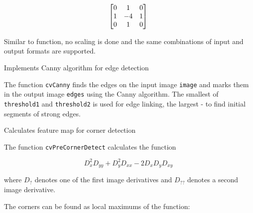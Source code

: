\[ \begin{bmatrix} 0 & 1 & 0\\ 1 & -4 & 1\\ 0 & 1 & 0 \end{bmatrix} \]

Similar to  function, no scaling is done and the same combinations of input and output formats are supported.

\label{Canny}
Implements Canny algorithm for edge detection

\begin{description}
\end{description}

The function \texttt{cvCanny} finds the edges on the input image \texttt{image} and marks them in the output image \texttt{edges} using the Canny algorithm. The smallest of \texttt{threshold1} and \texttt{threshold2} is used for edge linking, the largest - to find initial segments of strong edges.

\label{PreCornerDetect}
Calculates feature map for corner detection

\begin{description}
\end{description}

The function \texttt{cvPreCornerDetect} calculates the function

\[
D_x^2 D_{yy} + D_y^2 D_{xx} - 2 D_x D_y D_{xy}
\]

where $D_?$ denotes one of the first image derivatives and $D_{??}$ denotes a second image derivative.

The corners can be found as local maximums of the function:

